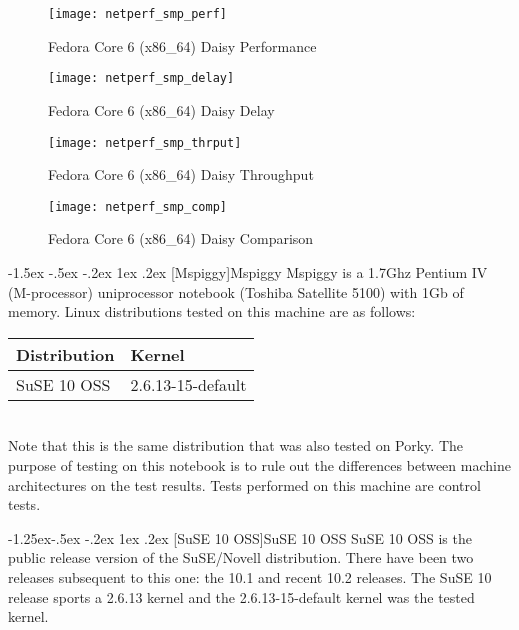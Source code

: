 \documentclass[letterpaper,final,notitlepage,twocolumn,10pt,twoside]{article}
\makeatletter
\let\normalsize\small
\let\small\footnotesize
\let\footnotesize\scriptsize
\let\scriptsize\tiny
\renewcommand\subsection{\@startsection{subsection}{2}{\z@}%
                                     {-1.5ex \@plus -.5ex \@minus -.2ex}%
                                     {1ex \@plus .2ex}%
                                     {\normalfont\normalsize\bfseries}}
\renewcommand\subsubsection{\@startsection{subsubsection}{3}{\z@}%
                                     {-1.25ex\@plus -.5ex \@minus -.2ex}%
                                     {1ex \@plus .2ex}%
                                     {\normalfont\normalsize\bfseries}}
\makeatother
\begin{document}
\begin{figure}[p]
\center\texttt{[image: netperf\_smp\_perf]}
\caption[Fedora Core 6 (x86\_64) Daisy Performance]{Fedora Core 6 (x86\_64) Daisy Performance}
\label{figure:smpperf}
\end{figure}

\begin{figure}[p]
\center\texttt{[image: netperf\_smp\_delay]}
\caption[Fedora Core 6 (x86\_64) Daisy Delay]{Fedora Core 6 (x86\_64) Daisy Delay}
\label{figure:smpdly}
\end{figure}

\begin{figure}[p]
\center\texttt{[image: netperf\_smp\_thrput]}
\caption[Fedora Core 6 (x86\_64) Daisy Throughput]{Fedora Core 6 (x86\_64) Daisy Throughput}
\label{figure:smpthrput}
\end{figure}

\begin{figure}[p]
\center\texttt{[image: netperf\_smp\_comp]}
\caption[Fedora Core 6 (x86\_64) Daisy Comparison]{Fedora Core 6 (x86\_64) Daisy Comparison}
\label{figure:smpcomp}
\end{figure}

\subsection[Mspiggy]{Mspiggy}
Mspiggy is a 1.7Ghz Pentium IV (M-processor) uniprocessor notebook (Toshiba
Satellite 5100) with 1Gb of memory.  Linux distributions tested on this
machine are as follows:

\begin{tabular}{ll}\\
Distribution & Kernel\\
\hline
SuSE 10 OSS & 2.6.13-15-default\\
\end{tabular}\\[1.0ex]

Note that this is the same distribution that was also tested on Porky.  The
purpose of testing on this notebook is to rule out the differences between
machine architectures on the test results.  Tests performed on this machine
are control tests.

\subsubsection[SuSE 10 OSS]{SuSE 10 OSS}
SuSE 10 OSS is the public release version of the SuSE/Novell distribution.
There have been two releases subsequent to this one: the 10.1 and recent 10.2
releases.  The SuSE 10 release sports a 2.6.13 kernel and the
2.6.13-15-default kernel was the tested kernel.
\end{document}
